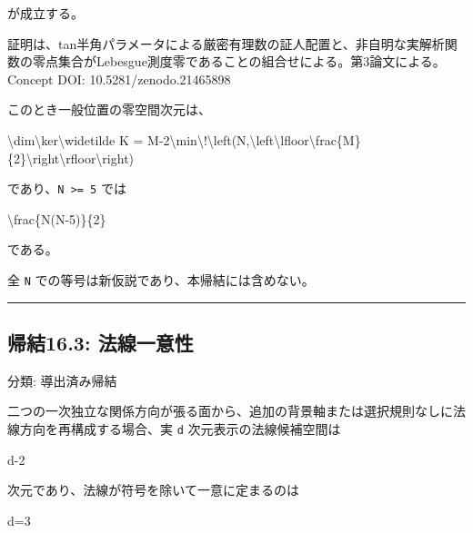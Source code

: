 \documentclass[
  a4paper,
]{ltjsarticle}
\newenvironment{Shaded}{}{}
\newcommand{\NormalTok}[1]{#1}
\begin{document}
が成立する。

証明は、tan半角パラメータによる厳密有理数の証人配置と、非自明な実解析関数の零点集合がLebesgue測度零であることの組合せによる。第3論文による。Concept
DOI: 10.5281/zenodo.21465898

このとき一般位置の零空間次元は、

\begin{Shaded}
\begin{Highlighting}[]
\NormalTok{\textbackslash{}dim\textbackslash{}ker\textbackslash{}widetilde K}
\NormalTok{=}
\NormalTok{M{-}2\textbackslash{}min\textbackslash{}!\textbackslash{}left(N,\textbackslash{}left\textbackslash{}lfloor\textbackslash{}frac\{M\}\{2\}\textbackslash{}right\textbackslash{}rfloor\textbackslash{}right)}
\end{Highlighting}
\end{Shaded}

であり、\texttt{N\ \textgreater{}=\ 5} では

\begin{Shaded}
\begin{Highlighting}[]
\NormalTok{\textbackslash{}frac\{N(N{-}5)\}\{2\}}
\end{Highlighting}
\end{Shaded}

である。

全 \texttt{N} での等号は新仮説であり、本帰結には含めない。

\begin{center}\rule{0.5\linewidth}{0.5pt}\end{center}

\subsection{帰結16.3:
法線一意性}\label{ux5e30ux7d5016.3-ux6cd5ux7ddaux4e00ux610fux6027}

分類: 導出済み帰結

二つの一次独立な関係方向が張る面から、追加の背景軸または選択規則なしに法線方向を再構成する場合、実
\texttt{d} 次元表示の法線候補空間は

\begin{Shaded}
\begin{Highlighting}[]
\NormalTok{d{-}2}
\end{Highlighting}
\end{Shaded}

次元であり、法線が符号を除いて一意に定まるのは

\begin{Shaded}
\begin{Highlighting}[]
\NormalTok{d=3}
\end{Highlighting}
\end{Shaded}
\end{document}
